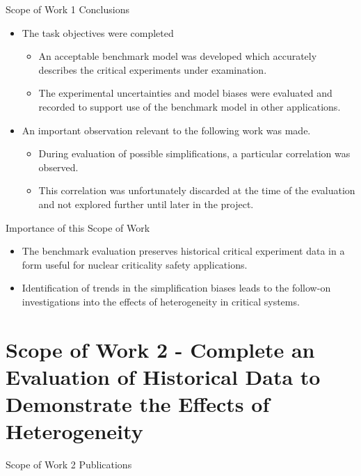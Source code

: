 \documentclass[10pt,aspectratio=169]{beamer}              %
\begin{document}
\begin{frame}{Scope of Work 1 Conclusions}
        \begin{itemize}
        \item The task objectives were completed
        \begin{itemize}
            \item An acceptable benchmark model was developed which accurately describes the critical experiments under examination.
            \item The experimental uncertainties and model biases were evaluated and recorded to support use of the benchmark model in other applications.
        \end{itemize}
        \item An important observation relevant to the following work was made.
        \begin{itemize}
            \item During evaluation of possible simplifications, a particular correlation was observed.
            \item This correlation was unfortunately discarded at the time of the evaluation and not explored further until later in the project.
        \end{itemize} 
    \end{itemize}
        \begin{alertblock}{Importance of this Scope of Work}
        \begin{itemize}
            \item The benchmark evaluation preserves historical critical experiment data in a form useful for nuclear criticality safety applications.
            \item Identification of trends in the simplification biases leads to the follow-on investigations into the effects of heterogeneity in critical systems.
        \end{itemize}
    \end{alertblock}
\end{frame}

\section[Scope of Work 2]{Scope of Work 2 - Complete an Evaluation of Historical Data to Demonstrate the Effects of Heterogeneity}

\begin{frame}{Scope of Work 2 Publications}
    \begin{block}{}
        \textbf{}
    \end{block}
\end{frame}
\end{document}
